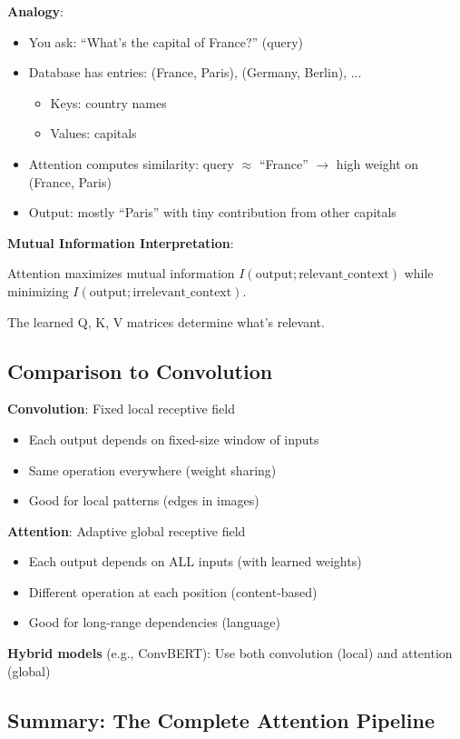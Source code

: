 \documentclass[11pt,oneside]{book}
\begin{document}
\textbf{Analogy}:
\begin{itemize}
\item You ask: ``What's the capital of France?'' (query)
\item Database has entries: (France, Paris), (Germany, Berlin), ...
\begin{itemize}
\item Keys: country names
\item Values: capitals
\end{itemize}
\item Attention computes similarity: query $\approx$ ``France'' $\to$ high weight on (France, Paris)
\item Output: mostly ``Paris'' with tiny contribution from other capitals
\end{itemize}

\textbf{Mutual Information Interpretation}:

Attention maximizes mutual information $I(\text{output}; \text{relevant\_context})$ while minimizing $I(\text{output}; \text{irrelevant\_context})$.

The learned Q, K, V matrices determine what's relevant.

\subsection{Comparison to Convolution}

\textbf{Convolution}: Fixed local receptive field
\begin{itemize}
\item Each output depends on fixed-size window of inputs
\item Same operation everywhere (weight sharing)
\item Good for local patterns (edges in images)
\end{itemize}

\textbf{Attention}: Adaptive global receptive field
\begin{itemize}
\item Each output depends on ALL inputs (with learned weights)
\item Different operation at each position (content-based)
\item Good for long-range dependencies (language)
\end{itemize}

\textbf{Hybrid models} (e.g., ConvBERT): Use both convolution (local) and attention (global)

\subsection{Summary: The Complete Attention Pipeline}
\end{document}
